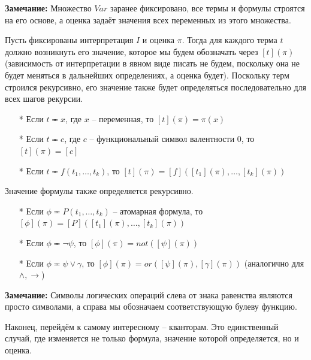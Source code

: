 \textbf{Замечание:} Множество $Var$ заранее фиксировано, все термы и формулы строятся на его основе, а оценка
задаёт значения всех переменных из этого множества.
\newline \par Пусть фиксированы интерпретация $I$ и оценка $\pi$. Тогда для каждого терма $t$ должно возникнуть его значение, которое мы будем обозначать через $[t](\pi)$ (зависимость
от интерпретации в явном виде писать не будем, поскольку она не будет меняться в дальнейших определениях, а оценка будет). Поскольку терм строился рекурсивно, его
значение также будет определяться последовательно для всех шагов рекурсии.
\begin{itemize}
    \item[*] Если $t\eqcirc x$, где $x$ -- переменная, то $[t](\pi)=\pi(x)$
    \item[*] Если $t\eqcirc c$, где $c$ -- функциональный символ валентности 0, то $[t](\pi)=[c]$
    \item[*] Если $t\eqcirc f(t_1,\ldots,t_k)$, то $[t](\pi)=[f]([t_1](\pi),\ldots,[t_k](\pi))$
\end{itemize}
Значение формулы также определяется рекурсивно.
\begin{itemize}
    \item[*] Если $\phi\eqcirc P(t_1,\ldots,t_k)$ -- атомарная формула, то $[\phi](\pi)=[P]([t_1](\pi),\ldots,[t_k](\pi))$
    \item[*] Если $\phi\eqcirc \neg\psi$, то $[\phi](\pi)=not([\psi](\pi))$ 
    \item[*] Если $\phi\eqcirc \psi \lor\gamma$, то $[\phi](\pi)=or([\psi](\pi),[\gamma](\pi))$ (аналогично для $\land, \to$)
\end{itemize}

\textbf{Замечание:} Символы логических операций слева от знака равенства являются просто символами, а
справа мы обозначаем соответствующую булеву функцию.
\newline \par  Наконец, перейдём к самому интересному -- кванторам. Это единственный случай,
где изменяется не только формула, значение которой определяется, но и оценка.

